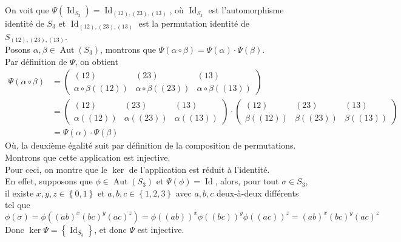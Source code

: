 \documentclass[11pt, a4paper]{article}
\DeclareMathOperator*{\aut}{Aut}
\DeclareMathOperator*{\id}{Id}
\begin{document}
On voit que $\Psi( \id_{S_3} )= \id_{( 12) ,( 23) , ( 13) }$, où $\id_{S_3} $ est l'automorphisme identité de $S_3$ et $\id_{( 12) ,( 23) , ( 13) }$ est la permutation identité de $S_{( 12) ,( 23) , ( 13) } $.\\
Posons $\alpha,\beta\in \aut( S_3) $, montrons que $\Psi( \alpha\circ \beta) = \Psi( \alpha)\cdot \Psi( \beta) $.\\
Par définition de $\Psi$, on obtient
\begin{align*}
	\Psi ( \alpha \circ \beta) &=  
\begin{pmatrix}
	( 12) & ( 23) & ( 13)\\
	\alpha \circ \beta ( ( 12) ) & \alpha \circ \beta ( ( 23) ) & \alpha \circ \beta ( ( 13) ) 
\end{pmatrix}\\
				   &= 
				   \begin{pmatrix}
	( 12) & ( 23) & ( 13)\\
	\alpha ( ( 12) ) &\alpha ( ( 23) ) &  \alpha ( ( 13) ) 
				   \end{pmatrix}\cdot
				   \begin{pmatrix}
	( 12) & ( 23) & ( 13)\\
	\beta ( ( 12) ) &\beta ( ( 23) ) &  \beta ( ( 13) ) 
				   \end{pmatrix}\\
				   &= \Psi( \alpha) \cdot \Psi( \beta) 
\end{align*}
Où, la deuxième égalité suit par définition de la composition de permutations.\\
Montrons que cette application est injective.\\
Pour ceci, on montre que le $\ker$ de l'application est réduit à l'identité.\\
En effet, supposons que $\phi\in \aut( S_3) $ et $\Psi( \phi) = \id$, alors, pour tout $\sigma\in S_3$, il existe $x,y,z \in \left\{ 0,1 \right\} $ et $a,b,c \in \left\{ 1,2,3 \right\} $ avec $a,b,c$ deux-à-deux différents tel que
\[ 
	\phi( \sigma) = \phi( ( ab)^{x}( bc) ^{y} ( ac) ^{z} ) = \phi( ( ab) ) ^{x} \phi( ( bc) )^{y} \phi( ( ac) ) ^{z}	= ( ab) ^{x} ( bc) ^{y}( ac) ^{z}
\]
Donc $\ker \Psi = \left\{  \id_{S_3}\right\}$, et donc $\Psi$ est injective.
\end{document}
